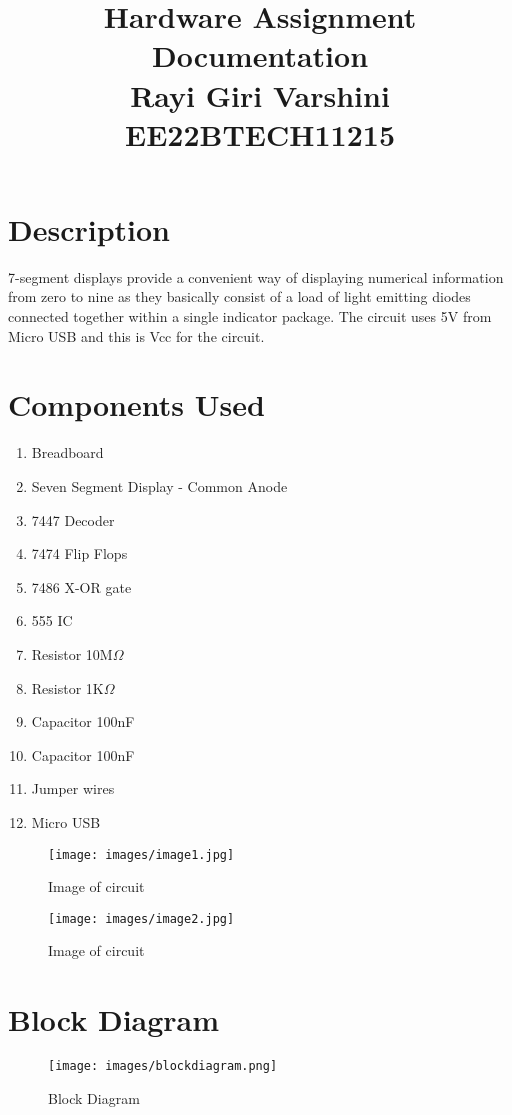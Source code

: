 \documentclass{article}
\begin{document}
\title{Hardware Assignment Documentation\\ \large{Rayi Giri Varshini\\EE22BTECH11215}}
\author{}
\date{}
\maketitle
\maketitle

\section*{Description}

	7-segment displays provide a convenient way of displaying numerical information from zero to nine as they basically consist of a load of light emitting diodes connected together within a single indicator package. The circuit uses 5V from Micro USB and this is Vcc for the circuit.
    
\section*{Components Used}
\begin{enumerate}
    \item Breadboard
    \item Seven Segment Display - Common Anode
    \item 7447 Decoder
    \item 7474 Flip Flops
    \item 7486 X-OR gate
    \item 555 IC
    \item Resistor 10M$\Omega$
    \item Resistor 1K$\Omega$
    \item Capacitor 100nF
    \item Capacitor 100nF
    \item Jumper wires
    \item Micro USB
\end{enumerate}

\begin{figure}[ht]
	\centering
	\texttt{[image: images/image1.jpg]}
	\caption{Image of circuit}
	\label{fig:view}
\end{figure}
\FloatBarrier

\begin{figure}[ht]
	\centering
	\texttt{[image: images/image2.jpg]}
	\caption{Image of circuit}
	\label{fig:view}
\end{figure}
\FloatBarrier

\section*{Block Diagram}
\begin{figure}[ht]
	\centering
	\texttt{[image: images/blockdiagram.png]}
	\caption{Block Diagram}
	\label{fig:view}
\end{figure}
\FloatBarrier
\end{document}
